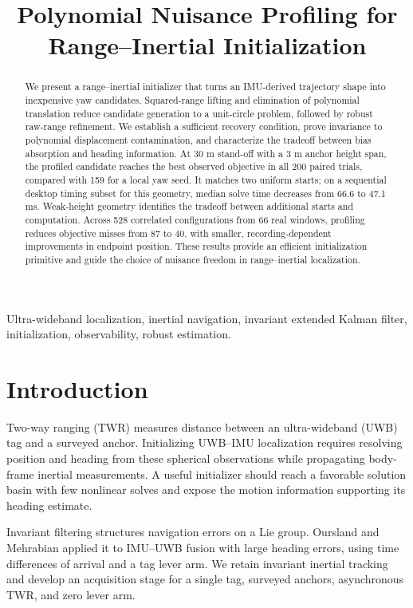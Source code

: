 \documentclass[conference,letterpaper,10pt]{IEEEtran}
\title{Polynomial Nuisance Profiling for\\Range--Inertial Initialization}
\author{\IEEEauthorblockN{Anonymous Authors}}
\begin{document}
\maketitle

\begin{abstract}
We present a range--inertial initializer that turns an IMU-derived trajectory shape into inexpensive yaw candidates. Squared-range lifting and elimination of polynomial translation reduce candidate generation to a unit-circle problem, followed by robust raw-range refinement. We establish a sufficient recovery condition, prove invariance to polynomial displacement contamination, and characterize the tradeoff between bias absorption and heading information. At 30 m stand-off with a 3 m anchor height span, the profiled candidate reaches the best observed objective in all 200 paired trials, compared with 159 for a local yaw seed. It matches two uniform starts; on a sequential desktop timing subset for this geometry, median solve time decreases from 66.6 to 47.1 ms. Weak-height geometry identifies the tradeoff between additional starts and computation. Across 528 correlated configurations from 66 real windows, profiling reduces objective misses from 87 to 40, with smaller, recording-dependent improvements in endpoint position. These results provide an efficient initialization primitive and guide the choice of nuisance freedom in range--inertial localization.
\end{abstract}

\begin{IEEEkeywords}
Ultra-wideband localization, inertial navigation, invariant extended Kalman filter, initialization, observability, robust estimation.
\end{IEEEkeywords}

\section{Introduction}
Two-way ranging (TWR) measures distance between an ultra-wideband (UWB) tag and a surveyed anchor. Initializing UWB--IMU localization requires resolving position and heading from these spherical observations while propagating body-frame inertial measurements. A useful initializer should reach a favorable solution basin with few nonlinear solves and expose the motion information supporting its heading estimate.

Invariant filtering structures navigation errors on a Lie group\cite{barrau2017}. Oursland and Mehrabian applied it to IMU--UWB fusion with large heading errors, using time differences of arrival and a tag lever arm\cite{oursland2024}. We retain invariant inertial tracking and develop an acquisition stage for a single tag, surveyed anchors, asynchronous TWR, and zero lever arm.
\end{document}
